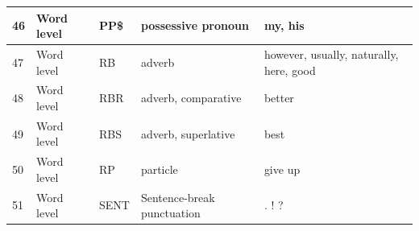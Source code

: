 \begin{longtable}{|p{}|p{}|p{}|p{}|p{}|}
		\rowcolor[HTML]{FFFFC7} 
		46                                                        & Word level                                                  & PP\$                                                       & possessive pronoun                                                                                              & my, his                                                                         \\ \hline
		\rowcolor[HTML]{9AFF99} 
		47                                                        & Word level                                                  & RB                                                         & adverb                                                                                                          & however, usually, naturally, here, good                                         \\ \hline
		\rowcolor[HTML]{9AFF99} 
		48                                                        & Word level                                                  & RBR                                                        & adverb, comparative                                                                                             & better                                                                          \\ \hline
		\rowcolor[HTML]{9AFF99} 
		49                                                        & Word level                                                  & RBS                                                        & adverb, superlative                                                                                             & best                                                                            \\ \hline
		\rowcolor[HTML]{9AFF99} 
		50                                                        & Word level                                                  & RP                                                         & particle                                                                                                        & give up                                                                         \\ \hline
		\rowcolor[HTML]{9AFF99} 
		51                                                        & Word level                                                  & SENT                                                       & Sentence-break punctuation                                                                                      & . ! ?                                                                           \\ \hline

\end{longtable}

